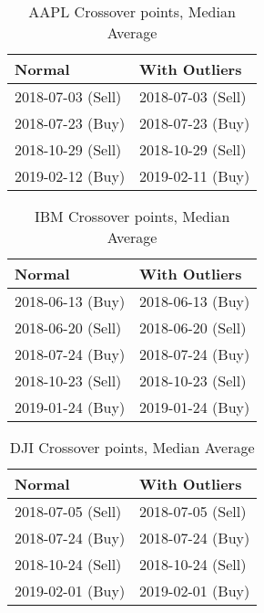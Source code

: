 \begin{table}[!htb]
    \centering
    \begin{tabular}{l|l}
    Normal            & With Outliers     \\ \hline
    2018-07-03 (Sell) & 2018-07-03 (Sell) \\
    2018-07-23 (Buy)  & 2018-07-23 (Buy)  \\
    2018-10-29 (Sell) & 2018-10-29 (Sell) \\
    2019-02-12 (Buy)  & 2019-02-11 (Buy)  

    \end{tabular}
    \caption{AAPL Crossover points, Median Average}
    \label{table:part_4:aapl_cp_med}
\end{table}

\begin{table}[!htb]
    \centering
    \begin{tabular}{l|l}
    Normal            & With Outliers     \\ \hline
    2018-06-13 (Buy) & 2018-06-13 (Buy) \\
    2018-06-20 (Sell)  & 2018-06-20 (Sell)  \\
    2018-07-24 (Buy) & 2018-07-24 (Buy) \\
    2018-10-23 (Sell)  & 2018-10-23 (Sell)  \\
    2019-01-24 (Buy)  & 2019-01-24 (Buy)

    \end{tabular}
    \caption{IBM Crossover points, Median Average}
    \label{table:part_4:ibm_cp_med}
\end{table}

\begin{table}[!htb]
    \centering
    \begin{tabular}{l|l}
    Normal            & With Outliers     \\ \hline
    2018-07-05 (Sell) & 2018-07-05 (Sell) \\
    2018-07-24 (Buy)  & 2018-07-24 (Buy)  \\
    2018-10-24 (Sell) & 2018-10-24 (Sell) \\
    2019-02-01 (Buy)  & 2019-02-01 (Buy)  

    \end{tabular}
    \caption{DJI Crossover points, Median Average}
    \label{table:part_4:dji_cp_med}
\end{table}

